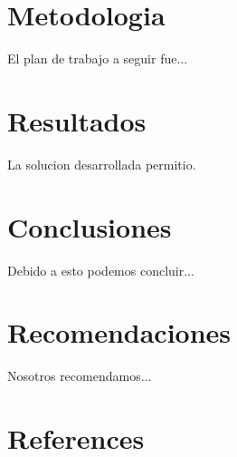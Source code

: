 \documentclass{amsart}
\begin{document}
    
        
            
       

    \section{Metodologia}
        El plan de trabajo a seguir fue...
        
        


    
    \section{Resultados}
    La solucion desarrollada permitio.

    \section{Conclusiones}
    Debido a esto podemos concluir...
    
    
    \section{Recomendaciones}
    Nosotros recomendamos...


    \section{References}
    \printbibliography
\end{document}

